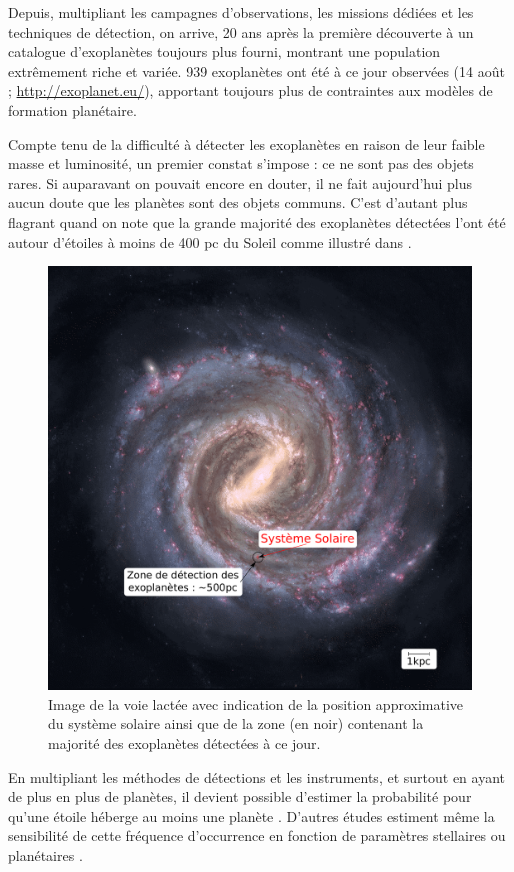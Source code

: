 Depuis, multipliant les campagnes d'observations, les missions dédiées et les techniques de détection, on arrive, 20 ans après la première découverte à un catalogue d'exoplanètes toujours plus fourni, montrant une population extrêmement riche et variée. 939 exoplanètes ont été à ce jour observées (14 août ; \url{http://exoplanet.eu/}), apportant toujours plus de contraintes aux modèles de formation planétaire. 

Compte tenu de la difficulté à détecter les exoplanètes en raison de leur faible masse et luminosité, un premier constat s'impose : ce ne sont pas des objets rares. Si auparavant on pouvait encore en douter, il ne fait aujourd'hui plus aucun doute que les planètes sont des objets communs. C'est d'autant plus flagrant quand on note que la grande majorité des exoplanètes détectées l'ont été autour d'étoiles à moins de 400 pc du Soleil comme illustré dans . 

\begin{figure}[htbp]
\centering
\includegraphics[width=0.45\linewidth]{figure/milky_way_exoplanets.pdf}
\caption[Sphère de détection des exoplanètes par rapport à la Voie Lactée]{Image de la voie lactée avec indication de la
position approximative du système solaire ainsi que de la zone (en noir) contenant la majorité des exoplanètes détectées à ce
jour.}\label{fig:milky_way_exoplanet}
\end{figure}


En multipliant les méthodes de détections et les instruments, et surtout en ayant de plus en plus de planètes, il devient possible d'estimer la probabilité pour qu'une étoile héberge au moins une planète \citep{mayor2011road}. D'autres études estiment même la sensibilité de cette fréquence d'occurrence en fonction de paramètres stellaires \citep{fischer2005planet, johnson2007new, howard2012occurrence} ou planétaires \citep{mayor2011road, howard2010occurrence}. 

